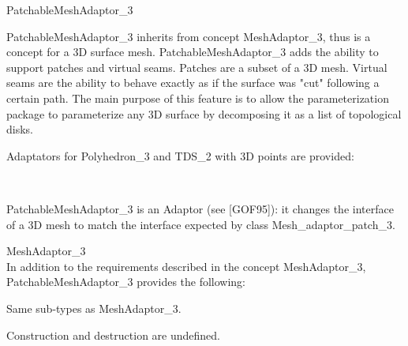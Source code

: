

\begin{ccRefConcept}{PatchableMeshAdaptor_3}


\ccDefinition

PatchableMeshAdaptor\_3 inherits from concept MeshAdaptor\_3, thus is a concept for a 3D surface mesh.
PatchableMeshAdaptor\_3 adds the ability to support patches and virtual seams. Patches are a subset of a 3D mesh. Virtual seams are the ability to behave exactly as if the surface was "cut" following a certain path.
The main purpose of this feature is to allow the parameterization package to parameterize any 3D surface by decomposing it as a list of topological disks.


\ccHasModels

Adaptators for Polyhedron\_3 and TDS\_2 with 3D points are provided:

 \\



PatchableMeshAdaptor\_3 is an Adaptor (see [GOF95]): it changes the interface of a 3D mesh to match the interface expected by class Mesh\_adaptor\_patch\_3.


\ccGeneralizes

MeshAdaptor\_3 \\

In addition to the requirements described in the concept MeshAdaptor\_3,
PatchableMeshAdaptor\_3 provides the following:


\ccTypes

Same sub-types as MeshAdaptor\_3.


\ccCreation
{}  %

Construction and destruction are undefined.



\end{ccRefConcept}
